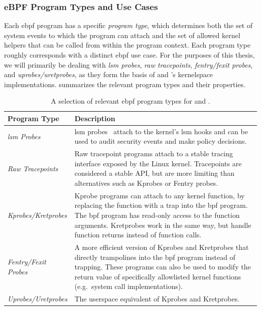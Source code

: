 \subsubsection*{eBPF Program Types and Use Cases}

Each \gls{ebpf} program has a specific \textit{program type}, which determines both the set of
system events to which the program can attach and the set of allowed kernel helpers that
can be called from within the program context. Each program type roughly corresponds with
a distinct \gls{ebpf} use case. For the purposes of this thesis, we will primarily be dealing
with \textit{\gls{lsm} probes}, \textit{raw tracepoints}, \textit{fentry/fexit probes}, and
\textit{uprobes/uretprobes}, as they form the basis of \bpfbox{} and \bpfcontain{}'s
kernelspace implementations.  summarizes the relevant program types
and their properties.

\begingroup\footnotesize
\begin{longtable}[c]{lp{4.2in}}
\caption[A selection of relevant eBPF program types for \bpfbox{} and \bpfcontain{}]{A selection of relevant \gls{ebpf} program types for \bpfbox{} and \bpfcontain{}.}%
\label{tab:program-types}\\
  \toprule
  Program Type & Description\\
  \midrule
  \textit{\gls{lsm} Probes}    & \gls{lsm} probes~\cite{singh2019_krsi} attach to the kernel's \gls{lsm} hooks and can be used to audit security events and make policy decisions.\\
  \textit{Raw Tracepoints}     & Raw tracepoint programs attach to a stable tracing interface exposed by the Linux kernel. Tracepoints are considered a stable API, but are more limiting than alternatives such as Kprobes or Fentry probes.\\
  \textit{Kprobes/Kretprobes}  & Kprobe programs can attach to any kernel function, by replacing the function with a trap into the \gls{bpf} program. The \gls{bpf} program has read-only access to the function arguments. Kretprobes work in the same way, but handle function returns instead of function calls.\\
  \textit{Fentry/Fexit Probes} & A more efficient version of Kprobes and Kretprobes that directly trampolines into the \gls{bpf} program instead of trapping. These programs can also be used to modify the return value of specifically allowlisted kernel functions (e.g.~system call implementations).\\
  \textit{Uprobes/Uretprobes}  & The userspace equivalent of Kprobes and Kretprobes.\\
  \bottomrule
\end{longtable}
\endgroup

